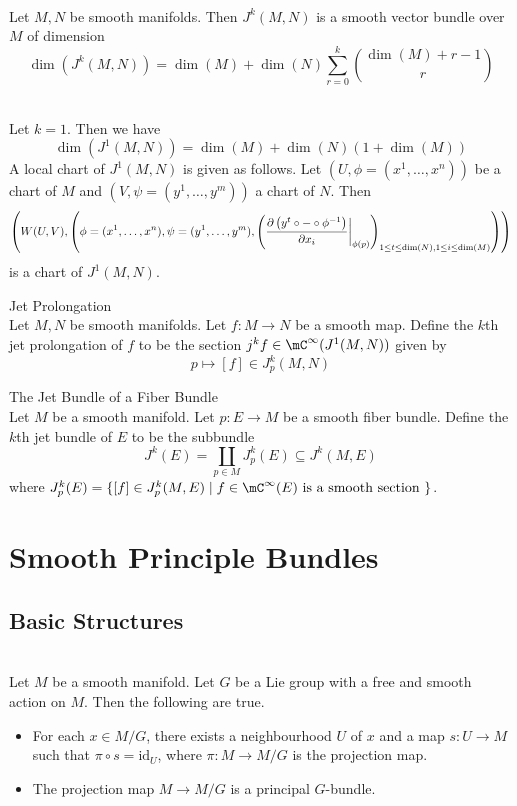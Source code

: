 \documentclass[a4paper]{article}
\begin{document}
\begin{lmm}{}{}\\
Let $M,N$ be smooth manifolds. Then $J^k(M,N)$ is a smooth vector bundle over $M$ of dimension $$\dim(J^k(M,N))=\dim(M)+\dim(N)\sum_{r=0}^k\binom{\dim(M)+r-1}{r}$$
\end{lmm}

\begin{eg}{}{}\\
Let $k=1$. Then we have $$\dim(J^1(M,N))=\dim(M)+\dim(N)\left(1+\dim(M)\right)$$ A local chart of $J^1(M,N)$ is given as follows. Let $(U,\phi=(x^1,\dots,x^n))$ be a chart of $M$ and $(V,\psi=(y^1,\dots,y^m))$ a chart of $N$. Then $$\left(W(U,V),\left(\phi=(x^1,\dots,x^n),\psi=(y^1,\dots,y^m),\left(\frac{\partial\left(y^t\circ-\circ\phi^{-1}\right)}{\partial x_i}\bigg{|}_{\phi(p)}\right)_{1\leq t\leq\dim(N),1\leq i\leq\dim(M)}\right)\right)$$ is a chart of $J^1(M,N)$. 
\end{eg}

\begin{defn}{Jet Prolongation}{}\\
Let $M,N$ be smooth manifolds. Let $f:M\to N$ be a smooth map. Define the $k$th jet prolongation of $f$ to be the section $j^kf\in\mC^\infty(J^1(M,N))$ given by $$p\mapsto[f]\in J_p^k(M,N)$$
\end{defn}

\begin{defn}{The Jet Bundle of a Fiber Bundle}{}\\
Let $M$ be a smooth manifold. Let $p:E\to M$ be a smooth fiber bundle. Define the $k$th jet bundle of $E$ to be the subbundle $$J^k(E)=\coprod_{p\in M}J_p^k(E)\subseteq J^k(M,E)$$ where $J_p^k(E)=\{[f]\in J_p^k(M,E)\;|\;f\in\mC^\infty(E)\text{ is a smooth section }\}$. 
\end{defn}

\pagebreak
\section{Smooth Principle Bundles}
\subsection{Basic Structures}
\begin{prp}{}{}\\
Let $M$ be a smooth manifold. Let $G$ be a Lie group with a free and smooth action on $M$. Then the following are true. 
\begin{itemize}
\item For each $x\in M/G$, there exists a neighbourhood $U$ of $x$ and a map $s:U\to M$ such that $\pi\circ s=\text{id}_U$, where $\pi:M\to M/G$ is the projection map. 
\item The projection map $M\to M/G$ is a principal $G$-bundle. 
\end{itemize}
\end{prp}
\end{document}
